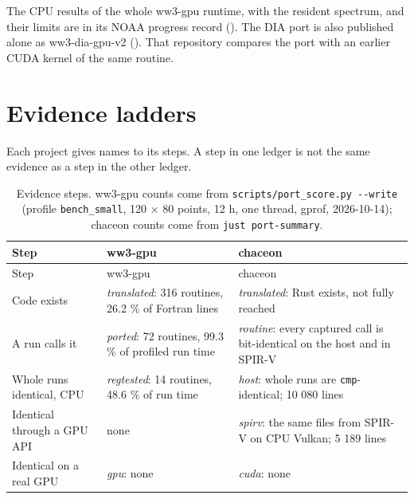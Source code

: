 \documentclass[10pt,a4paper,]{article}
\begin{document}
The CPU results of the whole ww3-gpu runtime, with the resident
spectrum, and their limits are in its NOAA progress record
(). The DIA port is also
published alone as ww3-dia-gpu-v2 (). That repository compares the port with an earlier CUDA kernel
of the same routine.

\section{Evidence ladders}\label{sec:ladders}

Each project gives names to its steps. A step in one ledger is not the
same evidence as a step in the other ledger.

\begin{longtable}[]{@{}
  >{\raggedright\arraybackslash}p{}
  >{\raggedright\arraybackslash}p{}
  >{\raggedright\arraybackslash}p{}@{}}
\caption{\label{tbl:ladders}Evidence steps. ww3-gpu counts come from
\texttt{scripts/port\_score.py\ -\/-write} (profile
\texttt{bench\_small}, 120 × 80 points, 12 h, one thread, gprof,
2026-10-14); chaceon counts come from
\texttt{just\ port-summary}.}\tabularnewline
\toprule\noalign{}
\begin{minipage}[b]{\linewidth}\raggedright
Step
\end{minipage} & \begin{minipage}[b]{\linewidth}\raggedright
ww3-gpu
\end{minipage} & \begin{minipage}[b]{\linewidth}\raggedright
chaceon
\end{minipage} \\
\midrule\noalign{}
\endfirsthead
\toprule\noalign{}
\begin{minipage}[b]{\linewidth}\raggedright
Step
\end{minipage} & \begin{minipage}[b]{\linewidth}\raggedright
ww3-gpu
\end{minipage} & \begin{minipage}[b]{\linewidth}\raggedright
chaceon
\end{minipage} \\
\midrule\noalign{}
\endhead
\bottomrule\noalign{}
\endlastfoot
Code exists & \emph{translated}: 316 routines, 26.2 \% of Fortran lines
& \emph{translated}: Rust exists, not fully reached \\
A run calls it & \emph{ported}: 72 routines, 99.3 \% of profiled run
time & \emph{routine}: every captured call is bit-identical on the host
and in SPIR-V \\
Whole runs identical, CPU & \emph{regtested}: 14 routines, 48.6 \% of
run time & \emph{host}: whole runs are \texttt{cmp}-identical; 10 080
lines \\
Identical through a GPU API & none & \emph{spirv}: the same files from
SPIR-V on CPU Vulkan; 5 189 lines \\
Identical on a real GPU & \emph{gpu}: none & \emph{cuda}: none \\
\end{longtable}
\end{document}
